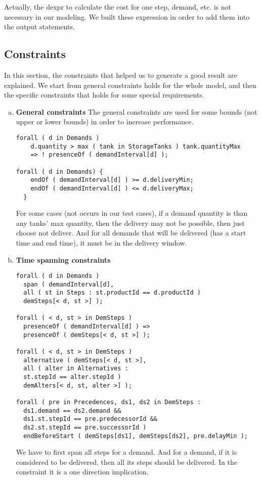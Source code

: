 \documentclass[a4paper, 12pt]{article}
\begin{document}
\begin{enumerate}
Actually, the dexpr to calculate the cost for one step, demand, etc. is not necessary in our modeling. We built these expression in order to add them into the output statements. 
\end{enumerate}

\subsection{Constraints}

In this section, the constraints that helped us to generate a good result are explained. We start from general constraints holds for the whole model, and then the specific constraints that holds for some special requirements. 

\begin{enumerate}[a.~]
\item \textbf{General constraints}
The general constraints are used for some bounds (not upper or lower bounds) in order to increase performance. 
\begin{lstlisting}
forall ( d in Demands )
    d.quantity > max ( tank in StorageTanks ) tank.quantityMax 
    => ! presenceOf ( demandInterval[d] );

forall ( d in Demands) {
    endOf ( demandInterval[d] ) >= d.deliveryMin;
    endOf ( demandInterval[d] ) <= d.deliveryMax;
  }
\end{lstlisting}
For some cases (not occurs in our test cases), if a demand quantity is  than any tanks' max quantity, then the delivery may not be possible, then just choose not deliver. And for all demands that will be delivered (has a start time and end time), it must be in the delivery window. 
\item \textbf{Time spanning constraints}
\begin{lstlisting}
forall ( d in Demands )
  span ( demandInterval[d], 
  all ( st in Steps : st.productId == d.productId )
  demSteps[< d, st >] );

forall ( < d, st > in DemSteps )
  presenceOf ( demandInterval[d] ) => 
  presenceOf ( demSteps[< d, st >] );

forall ( < d, st > in DemSteps )
  alternative ( demSteps[< d, st >], 
  all ( alter in Alternatives :
  st.stepId == alter.stepId ) 
  demAlters[< d, st, alter >] );

forall ( pre in Precedences, ds1, ds2 in DemSteps :
  ds1.demand == ds2.demand && 
  ds1.st.stepId == pre.predecessorId && 
  ds2.st.stepId == pre.successorId )
  endBeforeStart ( demSteps[ds1], demSteps[ds2], pre.delayMin );
\end{lstlisting}
We have to first span all steps for a demand. And for a demand, if it is considered to be delivered, then all its steps should be delivered. In the constraint it is a one direction implication. 


\end{enumerate}
\end{document}
